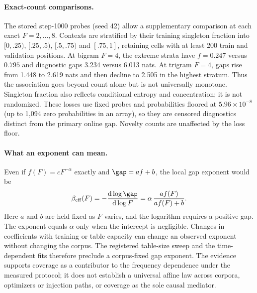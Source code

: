 \paragraph{Exact-count comparisons.}
The stored  step-1000 probes (seed 42) allow a supplementary comparison at each exact $F=2,\ldots,8$. Contexts are stratified by their training singleton fraction into $[0,.25)$, $[.25,.5)$, $[.5,.75)$ and $[.75,1]$, retaining cells with at least 200 train and validation positions. At bigram $F=4$, the extreme strata have $f=0.247$ versus $0.795$ and diagnostic gaps 3.234 versus 6.013 nats. At trigram $F=4$, gaps rise from 1.448 to 2.619 nats and then decline to 2.505 in the highest stratum. Thus the association goes beyond count alone but is not universally monotone. Singleton fraction also reflects conditional entropy and concentration; it is not randomized. These losses use fixed probes and probabilities floored at $5.96\times10^{-8}$ (up to 1,094 zero probabilities in an array), so they are censored diagnostics distinct from the primary online gap. Novelty counts are unaffected by the loss floor.

\paragraph{What an exponent can mean.}
Even if $f(F)=cF^{-\alpha}$ exactly and $\gap=af+b$, the local gap exponent would be
\begin{equation}
\beta_{\mathrm{eff}}(F)=-\frac{\mathrm d\log\gap}{\mathrm d\log F}
=\alpha\,\frac{af(F)}{af(F)+b}.
\label{eq:coverage-effective-exponent}
\end{equation}
Here $a$ and $b$ are held fixed as $F$ varies, and the logarithm requires a positive gap. The exponent equals $\alpha$ only when the intercept is negligible. Changes in coefficients with training or table capacity can change an observed exponent without changing the corpus. The registered table-size sweep and the time-dependent fits therefore preclude a corpus-fixed gap exponent. The evidence supports coverage as a contributor to the frequency dependence under the measured protocol; it does not establish a universal affine law across corpora, optimizers or injection paths, or coverage as the sole causal mediator.
